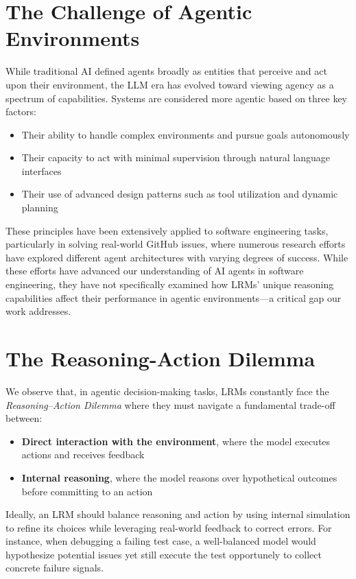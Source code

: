 \section{The Challenge of Agentic Environments}
While traditional AI defined agents broadly as entities that perceive and act upon their environment, the LLM era has evolved toward viewing agency as a spectrum of capabilities. Systems are considered more agentic based on three key factors:
\begin{itemize}
    \item Their ability to handle complex environments and pursue goals autonomously
    \item Their capacity to act with minimal supervision through natural language interfaces
    \item Their use of advanced design patterns such as tool utilization and dynamic planning
\end{itemize}

These principles have been extensively applied to software engineering tasks, particularly in solving real-world GitHub issues, where numerous research efforts have explored different agent architectures with varying degrees of success. While these efforts have advanced our understanding of AI agents in software engineering, they have not specifically examined how LRMs' unique reasoning capabilities affect their performance in agentic environments—a critical gap our work addresses.

\section{The Reasoning-Action Dilemma}
We observe that, in agentic decision-making tasks, LRMs constantly face the \emph{Reasoning–Action Dilemma} where they must navigate a fundamental trade-off between:
\begin{itemize}
    \item \textbf{Direct interaction with the environment}, where the model executes actions and receives feedback
    \item \textbf{Internal reasoning}, where the model reasons over hypothetical outcomes before committing to an action
\end{itemize}

Ideally, an LRM should balance reasoning and action by using internal simulation to refine its choices while leveraging real-world feedback to correct errors. For instance, when debugging a failing test case, a well-balanced model would hypothesize potential issues yet still execute the test opportunely to collect concrete failure signals.

